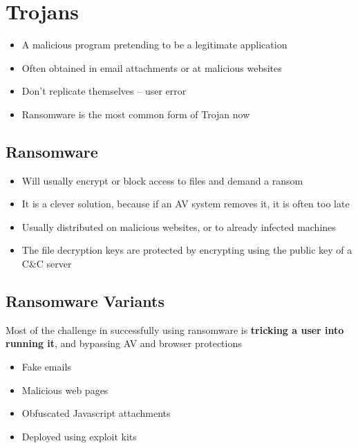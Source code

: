 \documentclass{article}
\begin{document}
\section{Trojans}
\begin{itemize}
  \item A malicious program pretending to be a legitimate application 
  \item Often obtained in email attachments or at malicious websites 
  \item Don’t replicate themselves – user error 
  \item Ransomware is the most common form of Trojan now
\end{itemize}

\subsection{Ransomware}
\begin{itemize}
  \item Will usually encrypt or block access to files and demand a ransom 
  \item It is a clever solution, because if an AV system removes it, it is often too late 
  \item Usually distributed on malicious websites, or to already infected machines 
  \item The file decryption keys are protected by encrypting using the public key of a C\&C server
\end{itemize}

\subsection{Ransomware Variants}
\begin{flushleft}
Most of the challenge in successfully using ransomware is \textbf{tricking a user into running it}, and bypassing AV and browser protections
\begin{itemize}
  \item Fake emails 
  \item Malicious web pages 
  \item Obfuscated Javascript attachments 
  \item Deployed using exploit kits
\end{itemize}
\end{flushleft}
\end{document}
